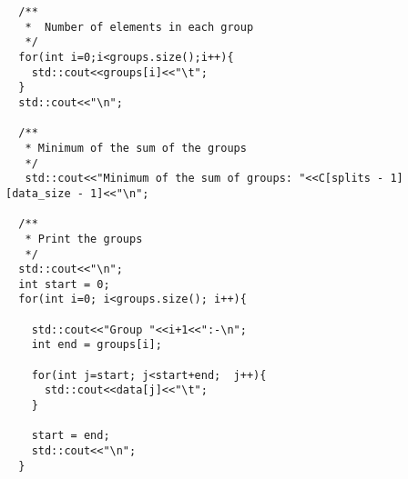 \documentclass{article}
\begin{document}
\begin{verbatim}
  /**
   *  Number of elements in each group
   */
  for(int i=0;i<groups.size();i++){
    std::cout<<groups[i]<<"\t";
  }
  std::cout<<"\n";

  /**
   * Minimum of the sum of the groups
   */
   std::cout<<"Minimum of the sum of groups: "<<C[splits - 1][data_size - 1]<<"\n";

  /**
   * Print the groups
   */
  std::cout<<"\n";
  int start = 0;
  for(int i=0; i<groups.size(); i++){

    std::cout<<"Group "<<i+1<<":-\n";
    int end = groups[i];

    for(int j=start; j<start+end;  j++){
      std::cout<<data[j]<<"\t";
    }

    start = end;
    std::cout<<"\n";
  }   
\end{verbatim}  
\end{document}
